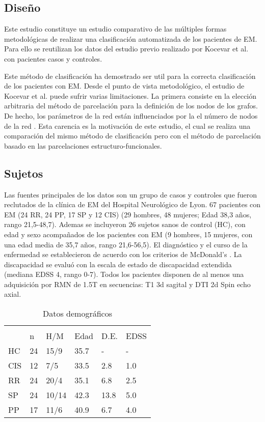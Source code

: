 \documentclass[fleqn,10pt]{UICArticle} %
\begin{document}
\subsection{Diseño}
Este estudio constituye un estudio comparativo de las múltiples formas metodológicas de realizar una clasificación automatizada de los pacientes de EM. Para ello se reutilizan los datos del estudio previo realizado por Kocevar et al. \cite{Kocevar2016} con pacientes casos y controles.

Este método de clasificación ha demostrado ser util para la correcta clasificación de los pacientes con EM. Desde el punto de vista metodológico, el estudio de Kocevar et al. \cite{Kocevar2016} puede sufrir varias limitaciones. La primera consiste en la elección arbitraria del método de parcelación para la definición de los nodos de los grafos. De hecho, los parámetros de la red están influenciados por la el número de nodos de la red \cite{Zalesky2010}. Esta carencia es la motivación de este estudio, el cual se realiza una comparación del mismo método de clasificación pero con el método de parcelación basado en las parcelaciones estructuro-funcionales.

\subsection{Sujetos}
Las fuentes principales de los datos son un grupo de casos y controles que fueron reclutados de la clínica de EM del Hospital Neurológico de Lyon. 67 pacientes con EM (24 RR, 24 PP, 17 SP y 12 CIS) (29 hombres, 48 mujeres; Edad 38,3 años, rango 21,5-48,7). Ademas se incluyeron 26 sujetos sanos de control (HC), con edad y sexo acompañados de los pacientes con EM (9 hombres, 15 mujeres, con una edad media de 35,7 años, rango 21,6-56,5). El diagnóstico y el curso de la enfermedad se establecieron de acuerdo con los criterios de McDonald's \cite{Polman2011}. La discapacidad se evaluó con la escala de estado de discapacidad extendida (mediana EDSS 4, rango 0-7). Todos los pacientes disponen de al menos una adquisición por RMN de 1.5T en secuencias: T1 3d sagital y DTI 2d Spin echo axial.

\begin{table}[hbt]
\caption{Datos demográficos}
\centering
\begin{tabular}{llllll}
\toprule
\multicolumn{6}{l}{} \\
     & n   & H/M    & Edad  & D.E.  & EDSS  \\
HC   & 24  & 15/9   & 35.7  & -     & -     \\
CIS  & 12  & 7/5    & 33.5  & 2.8   & 1.0   \\
RR   & 24  & 20/4   & 35.1  & 6.8   & 2.5   \\
SP   & 24  & 10/14  & 42.3  & 13.8  & 5.0   \\
PP   & 17  & 11/6   & 40.9  & 6.7   & 4.0   \\
\bottomrule
\end{tabular}
\label{tab:label}
\end{table}
\end{document}

